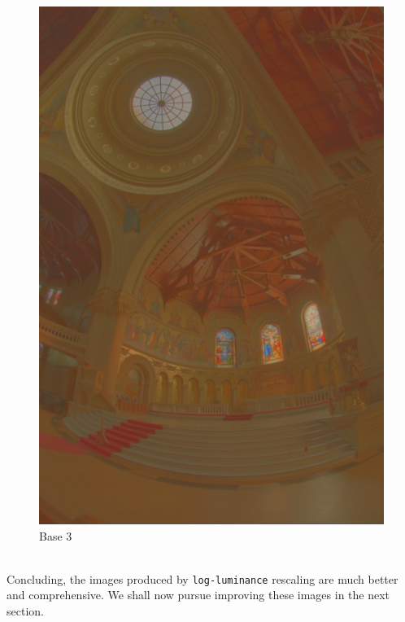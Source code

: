 \documentclass{article}
\begin{document}
\begin{figure}[!htb]
      \includegraphics[scale=.4]{./data/1/lgscl/b3.jpg}
      \caption{Base 3}
    \endminipage\hfill
    \end{figure}
    
    \\
    Concluding, the images produced by \texttt{log-luminance} rescaling are much better and comprehensive. We shall now pursue improving these images in the next section.
    
    \pagebreak
\end{document}
